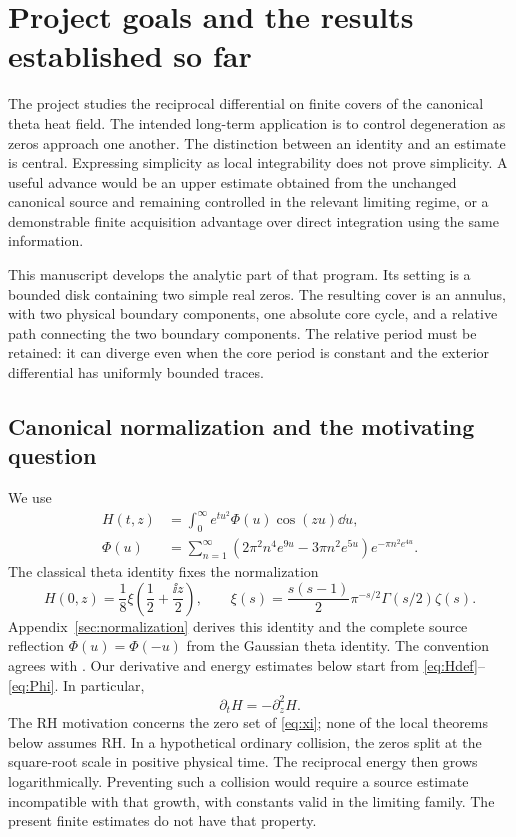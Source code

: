 \section{Project goals and the results established so far}\label{sec:goals}

The project studies the reciprocal differential on finite covers of the
canonical theta heat field. The intended long-term application is to
control degeneration as zeros approach one another. The distinction between
an identity and an estimate is central. Expressing simplicity as local
integrability does not prove simplicity. A useful advance would be an
upper estimate obtained from the unchanged canonical source and remaining
controlled in the relevant limiting regime, or a demonstrable finite
acquisition advantage over direct integration using the same information.

This manuscript develops the analytic part of that program. Its setting
is a bounded disk containing two simple real zeros. The resulting cover
is an annulus, with two physical boundary components, one absolute core
cycle, and a relative path connecting the two boundary components. The
relative period must be retained: it can diverge even when the core period
is constant and the exterior differential has uniformly bounded traces.

\subsection{Canonical normalization and the motivating question}
We use
\begin{align}
 H(t,z)&=\int_0^\infty e^{tu^2}\Phi(u)\cos(zu)\dd u,\label{eq:Hdef}\\
 \Phi(u)&=\sum_{n=1}^\infty
 (2\pi^2n^4e^{9u}-3\pi n^2e^{5u})e^{-\pi n^2e^{4u}}.
 \label{eq:Phi}
\end{align}
The classical theta identity fixes the normalization
\begin{equation}\label{eq:xi}
 H(0,z)=\frac18\xi\left(\frac12+\frac{\ii z}{2}\right),\qquad
 \xi(s)=\frac{s(s-1)}2\pi^{-s/2}\Gamma(s/2)\zeta(s).
\end{equation}
Appendix~\ref{sec:normalization} derives this identity and the complete
source reflection $\Phi(u)=\Phi(-u)$ from the Gaussian theta identity.
The convention agrees with \cite[(1)--(4)]{RT}.
Our derivative and energy estimates below start from
\eqref{eq:Hdef}--\eqref{eq:Phi}. In particular,
\begin{equation}\label{eq:heat}
 \partial_t H=-\partial_z^2H.
\end{equation}
The RH motivation concerns the zero set of \eqref{eq:xi}; none of the local
theorems below assumes RH. In a hypothetical ordinary collision, the
zeros split at the square-root scale in positive physical time. The
reciprocal energy then grows logarithmically. Preventing such a collision
would require a source estimate incompatible with that growth, with
constants valid in the limiting family. The present finite estimates do
not have that property.

